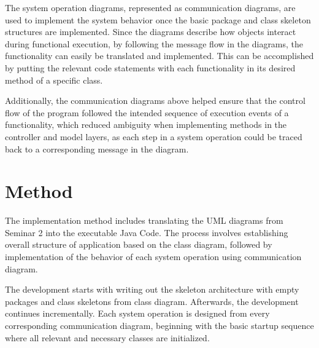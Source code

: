 \documentclass[a4paper]{scrartcl}
\begin{document}
The system operation diagrams, represented as communication diagrams, are used to implement the system behavior once the basic package and class skeleton structures are implemented. Since the diagrams describe how objects interact during functional execution, by following the message flow in the diagrams, the functionality can easily be translated and implemented. This can be accomplished by putting the relevant code statements with each functionality in its desired method of a specific class. 

Additionally, the communication diagrams above helped ensure that the control flow of the program followed the intended sequence of execution events of a functionality, which reduced ambiguity when implementing methods in the controller and model layers, as each step in a system operation could be traced back to a corresponding message in the diagram.

\section{Method}



The implementation method includes translating the UML diagrams from Seminar 2 into the executable Java Code. The process involves establishing overall structure of application based on the class diagram, followed by implementation of the behavior of each system operation using communication diagram.

The development starts with writing out the skeleton architecture with empty packages and class skeletons from class diagram. Afterwards, the development continues incrementally. Each system operation is designed from every corresponding communication diagram, beginning with the basic startup sequence where all relevant and necessary classes are initialized. 
\end{document}
